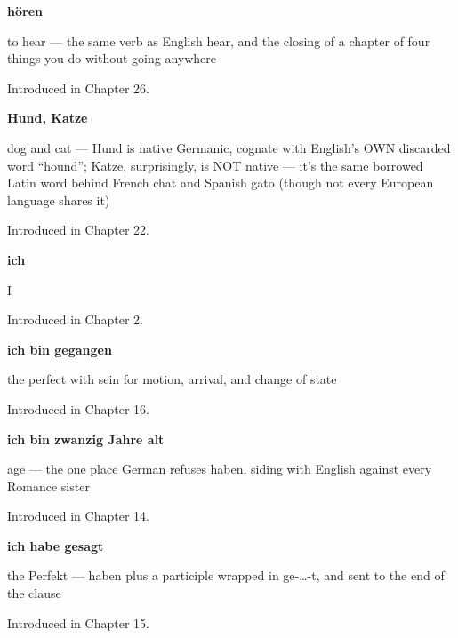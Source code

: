 \noindent\begin{minipage}[t]{\linewidth}
\raggedright
\textbf{hören}\par
\small to hear — the same verb as English hear, and the closing of a chapter of four things you do without going anywhere\par
\footnotesize Introduced in Chapter 26.
\end{minipage}\par\medskip

\noindent\begin{minipage}[t]{\linewidth}
\raggedright
\textbf{Hund, Katze}\par
\small dog and cat — Hund is native Germanic, cognate with English's OWN discarded word \textquotedblleft{}hound\textquotedblright{}; Katze, surprisingly, is NOT native — it's the same borrowed Latin word behind French chat and Spanish gato (though not every European language shares it)\par
\footnotesize Introduced in Chapter 22.
\end{minipage}\par\medskip

\noindent\begin{minipage}[t]{\linewidth}
\raggedright
\textbf{ich}\par
\small I\par
\footnotesize Introduced in Chapter 2.
\end{minipage}\par\medskip

\noindent\begin{minipage}[t]{\linewidth}
\raggedright
\textbf{ich bin gegangen}\par
\small the perfect with sein for motion, arrival, and change of state\par
\footnotesize Introduced in Chapter 16.
\end{minipage}\par\medskip

\noindent\begin{minipage}[t]{\linewidth}
\raggedright
\textbf{ich bin zwanzig Jahre alt}\par
\small age — the one place German refuses haben, siding with English against every Romance sister\par
\footnotesize Introduced in Chapter 14.
\end{minipage}\par\medskip

\noindent\begin{minipage}[t]{\linewidth}
\raggedright
\textbf{ich habe gesagt}\par
\small the Perfekt — haben plus a participle wrapped in ge-…-t, and sent to the end of the clause\par
\footnotesize Introduced in Chapter 15.
\end{minipage}\par\medskip

